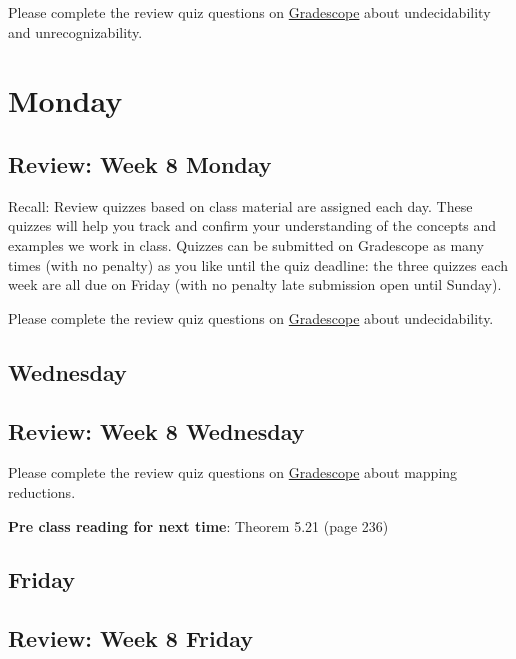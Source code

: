 Please complete the review quiz questions on \href{http://gradescope.com}{Gradescope} about 
undecidability and unrecognizability.

\newpage

\section*{Monday}


    
\newpage
\subsection*{Review: Week 8 Monday}


Recall: Review quizzes based on class material are assigned each day. 
These quizzes will help you track and confirm your understanding of the concepts and examples 
we work in class. Quizzes can be submitted on Gradescope as many times (with no penalty) as 
you like until the quiz deadline: the three quizzes each week are all due on Friday (with no penalty 
late submission open until Sunday).

Please complete the review quiz questions on \href{http://gradescope.com}{Gradescope} about 
undecidability.

\newpage
\subsection*{Wednesday}



\subsection*{Review: Week 8 Wednesday}

Please complete the review quiz questions on \href{http://gradescope.com}{Gradescope} about 
mapping reductions.

{\bf Pre class reading for next time}: Theorem 5.21 (page 236)



\newpage
\subsection*{Friday}



\newpage
\subsection*{Review: Week 8 Friday}


